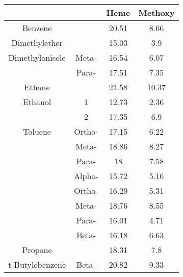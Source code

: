 \begin{table}[H]
\centering
\label{table:heme_methoxy}
\begin{tabular}{|c|c|c|c|}
\hline
 &  & Heme & Methoxy \\
\hline
Benzene &  & 20.51 & 8.66 \\
Dimethylether &  & 15.03 & 3.9 \\
Dimethylanisole & Meta- & 16.54 & 6.07 \\
 & Para- & 17.51 & 7.35 \\
Ethane &  & 21.58 & 10.37 \\
Ethanol & 1 & 12.73 & 2.36 \\
 & 2 & 17.35 & 6.9 \\
Toluene & Ortho- & 17.15 & 6.22 \\
 & Meta- & 18.86 & 8.27 \\
 & Para- & 18 & 7.58 \\
 & Alpha- & 15.72 & 5.16 \\
 & Ortho- & 16.29 & 5.31 \\
 & Meta- & 18.76 & 8.55 \\
 & Para- & 16.01 & 4.71 \\
 & Beta- & 16.18 & 6.63 \\
Propane &  & 18.31 & 7.8 \\
t-Butylebenzene & Beta- & 20.82 & 9.33 \\
\hline
\end{tabular}
\caption{}
\end{table}
